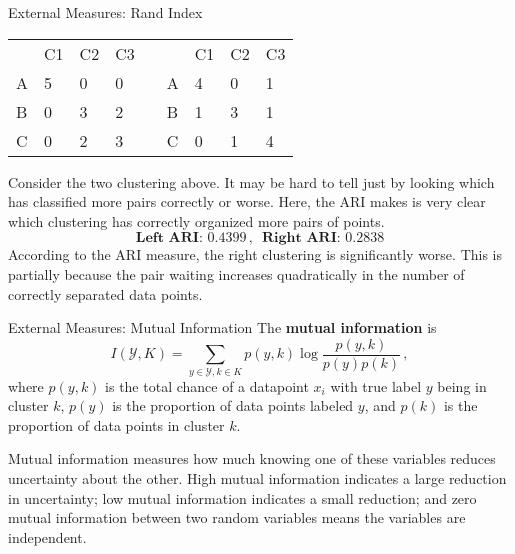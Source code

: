 \documentclass[10pt, table, dvipsnames,xcdraw,handout]{beamer}
\newcommand{\cY}{\ensuremath{\mathcal{Y}}}
\begin{document}
\begin{frame}[fragile]{External Measures: Rand Index}
\begin{table}[]
\begin{tabular}{l | lll l l | lll}
  & C1 & C2 & C3 & &  & C1 & C2 & C3 \\ 
A & 5  & 0  & 0 & & A & 4  & 0  & 1\\
B & 0  & 3  & 2 & & B & 1  & 3  & 1\\
C & 0  & 2  & 3 & & C & 0  & 1  & 4
\end{tabular}
\end{table}


Consider the two clustering above. It may be hard to tell just by looking which has classified more pairs correctly or worse. Here, the ARI makes is very clear which clustering has correctly organized more pairs of points. 
$$
\textbf{Left ARI: } 0.4399\,,\,\,\, \textbf{Right ARI: }0.2838
$$
According to the ARI measure, the right clustering is significantly worse. This is partially because the pair waiting increases quadratically in the number of correctly separated data points. 
\end{frame}






\begin{frame}[fragile]{External Measures: Mutual Information}
The \textbf{mutual information} is
$$
I(\cY,K) = \sum_{y\in \cY, k\in K} p(y,k)\log\frac{p(y,k)}{p(y)p(k)}\,,
$$\pause
where $p(y,k)$ is the total chance of a datapoint $x_i$ with true label $y$ being in cluster $k$, $p(y)$ is the proportion of data points labeled $y$, and $p(k)$ is the proportion of data points in cluster $k$. \pause 

Mutual information measures how much knowing one of these variables reduces uncertainty about the other.
High mutual information indicates a large reduction in uncertainty; low mutual information indicates a small reduction; and zero mutual information between two random variables means the variables are independent. 
\end{frame}
\end{document}
